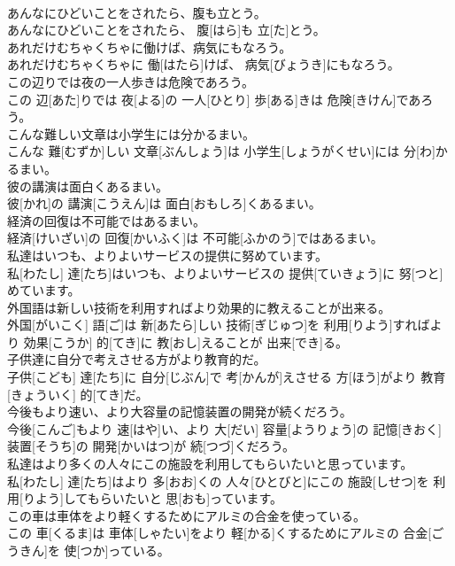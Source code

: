 \documentclass[8pt]{extreport}
\begin{document}
\begin{CJK}{UTF8}{min}
\\	あんなにひどいことをされたら、腹も立とう。	
\\	あんなにひどいことをされたら、 腹[はら]も 立[た]とう。
\\	あれだけむちゃくちゃに働けば、病気にもなろう。	
\\	あれだけむちゃくちゃに 働[はたら]けば、 病気[びょうき]にもなろう。
\\	この辺りでは夜の一人歩きは危険であろう。	
\\	この 辺[あた]りでは 夜[よる]の 一人[ひとり] 歩[ある]きは 危険[きけん]であろう。
\\	こんな難しい文章は小学生には分かるまい。	
\\	こんな 難[むずか]しい 文章[ぶんしょう]は 小学生[しょうがくせい]には 分[わ]かるまい。
\\	彼の講演は面白くあるまい。	
\\	彼[かれ]の 講演[こうえん]は 面白[おもしろ]くあるまい。
\\	経済の回復は不可能ではあるまい。	
\\	経済[けいざい]の 回復[かいふく]は 不可能[ふかのう]ではあるまい。
\\	私達はいつも、よりよいサービスの提供に努めています。	
\\	私[わたし] 達[たち]はいつも、よりよいサービスの 提供[ていきょう]に 努[つと]めています。
\\	外国語は新しい技術を利用すればより効果的に教えることが出来る。	
\\	外国[がいこく] 語[ご]は 新[あたら]しい 技術[ぎじゅつ]を 利用[りよう]すればより 効果[こうか] 的[てき]に 教[おし]えることが 出来[でき]る。
\\	子供達に自分で考えさせる方がより教育的だ。	
\\	子供[こども] 達[たち]に 自分[じぶん]で 考[かんが]えさせる 方[ほう]がより 教育[きょういく] 的[てき]だ。
\\	今後もより速い、より大容量の記憶装置の開発が続くだろう。	
\\	今後[こんご]もより 速[はや]い、より 大[だい] 容量[ようりょう]の 記憶[きおく] 装置[そうち]の 開発[かいはつ]が 続[つづ]くだろう。
\\	私達はより多くの人々にこの施設を利用してもらいたいと思っています。	
\\	私[わたし] 達[たち]はより 多[おお]くの 人々[ひとびと]にこの 施設[しせつ]を 利用[りよう]してもらいたいと 思[おも]っています。
\\	この車は車体をより軽くするためにアルミの合金を使っている。	
\\	この 車[くるま]は 車体[しゃたい]をより 軽[かる]くするためにアルミの 合金[ごうきん]を 使[つか]っている。

\end{CJK}
\end{document}
